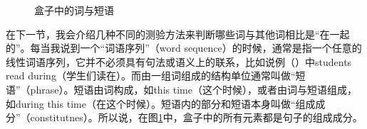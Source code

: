 \begin{figure}
\centering
{}
\caption{\label{Abbildung-Schachteln}盒子中的词与短语}
\end{figure}%

在下一节，我会介绍几种不同的测验方法来判断哪些词与其他词相比是“在一起的”。每当我说到一个“词语序列”（word sequence）的时候，通常是指一个任意的线性词语序列，它并不必须具有句法或语义上的联系，比如说例（）中students read during（学生们读在）。而由一组词组成的结构单位通常叫做“短语”（phrase）。短语由词构成，如this time（这个时候），或者由词与短语组成，如during this time（在这个时候）。短语内的部分和短语本身叫做“组成成分”（constitutnes）。所以说，在图\ref{Abbildung-Schachteln}中，盒子中的所有元素都是句子的组成成分。


